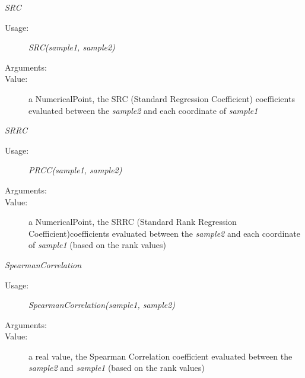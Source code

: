 \begin{description}
\begin{description}
\item \textit{SRC}
\begin{description}
\item[Usage:] \textit{SRC(sample1, sample2)}
\item[Arguments:] \rule{0pt}{1em}
\item[Value:]  a NumericalPoint, the SRC (Standard Regression Coefficient)  coefficients evaluated between the \textit{sample2} and each coordinate of \textit{sample1}
\end{description}
\bigskip

\item \textit{SRRC}
\begin{description}
\item[Usage:] \textit{PRCC(sample1, sample2)}
\item[Arguments:] \rule{0pt}{1em}
\item[Value:]  a NumericalPoint, the SRRC (Standard Rank Regression Coefficient)coefficients evaluated between the \textit{sample2} and each coordinate of \textit{sample1} (based on the rank values)
\end{description}
\bigskip

\item \textit{SpearmanCorrelation}
\begin{description}
\item[Usage:] \textit{SpearmanCorrelation(sample1, sample2)}
\item[Arguments:] \rule{0pt}{1em}
\item[Value:]  a real value, the Spearman Correlation coefficient evaluated between the \textit{sample2} and \textit{sample1} (based on the rank values)
\end{description}
\bigskip

\end{description}

\end{description}



